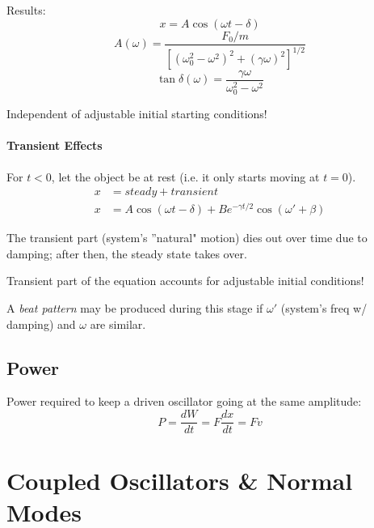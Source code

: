 \documentclass[11pt,letterpaper,titlepage,oneside]{book}
\begin{document}
Results: 
\[ x = A \cos (\omega t - \delta) \]
\[ A(\omega) = \frac{F_0/m}{[(\omega_0^2 - \omega^2)^2 + (\gamma\omega)^2]^{1/2}} \]
\[ \tan \delta (\omega) = \frac{\gamma\omega}{\omega_0^2 - \omega^2}\]

Independent of adjustable initial starting conditions!

\subsubsection{Transient Effects}
For $t<0$, let the object be at rest (i.e. it only starts moving at $t=0$).
\begin{align*}
x &= steady + transient \\
x &= A \cos (\omega t - \delta) + B e^{-\gamma t/2} \cos(\omega' + \beta)
\end{align*}

The transient part (system's ''natural" motion) dies out over time due to damping; after then, the steady state takes over. 

Transient part of the equation accounts for adjustable initial conditions!

A \emph{beat pattern} may be produced during this stage if $\omega'$ (system's freq w/ damping) and $\omega$ are similar.

\section{Power}
Power required to keep a driven oscillator going at the same amplitude:
\[ P = \frac{dW}{dt} = F\frac{dx}{dt} = Fv \]

\chapter{Coupled Oscillators \& Normal Modes}
\end{document}
